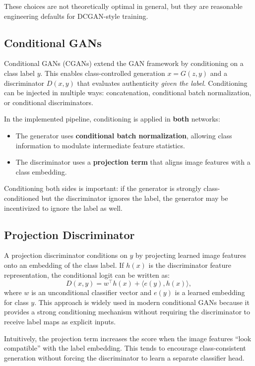 These choices are not theoretically optimal in general, but they are reasonable engineering defaults for DCGAN-style training.

\subsection{Conditional GANs}

Conditional GANs (CGANs) extend the GAN framework by conditioning on a class label \(y\). This enables class-controlled generation \(x = G(z, y)\) and a discriminator \(D(x, y)\) that evaluates authenticity \emph{given the label}. Conditioning can be injected in multiple ways: concatenation, conditional batch normalization, or conditional discriminators.

In the implemented pipeline, conditioning is applied in \textbf{both} networks:
\begin{itemize}
\item The generator uses \textbf{conditional batch normalization}, allowing class information to modulate intermediate feature statistics.
\item The discriminator uses a \textbf{projection term} that aligns image features with a class embedding.
\end{itemize}

Conditioning both sides is important: if the generator is strongly class-conditioned but the discriminator ignores the label, the generator may be incentivized to ignore the label as well.

\subsection{Projection Discriminator}

A projection discriminator conditions on \(y\) by projecting learned image features onto an embedding of the class label. If \(h(x)\) is the discriminator feature representation, the conditional logit can be written as:
\[
D(x, y) = w^\top h(x) + \langle e(y), h(x) \rangle,
\]
where \(w\) is an unconditional classifier vector and \(e(y)\) is a learned embedding for class \(y\). This approach is widely used in modern conditional GANs because it provides a strong conditioning mechanism without requiring the discriminator to receive label maps as explicit inputs.

Intuitively, the projection term increases the score when the image features ``look compatible'' with the label embedding. This tends to encourage class-consistent generation without forcing the discriminator to learn a separate classifier head.

